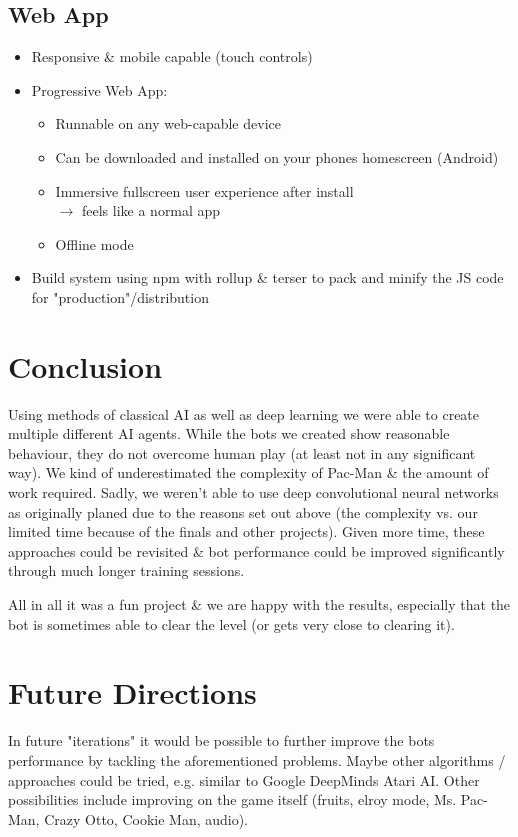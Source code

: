 \documentclass[10pt, letterpaper]{article}
\begin{document}
        \subsection{Web App}
            \begin{itemize}
                \item Responsive \& mobile capable (touch controls)
                \item Progressive Web App:
                    \begin{itemize}
                        \item Runnable on any web-capable device
                        \item Can be downloaded and installed on your phones homescreen (Android)
                        \item Immersive fullscreen user experience after install \\
                              $\rightarrow$ feels like a normal app
                        \item Offline mode
                    \end{itemize}
                \item Build system using npm with rollup \& terser to pack and minify the JS code for "production"/distribution
            \end{itemize}
            
    \section{Conclusion}
        Using methods of classical AI as well as deep learning we were able to create multiple different AI agents. While the bots we created show reasonable behaviour, they do not overcome human play (at least not in any significant way). We kind of underestimated the complexity of Pac-Man \& the amount of work required. Sadly, we weren't able to use deep convolutional neural networks as originally planed due to the reasons set out above (the complexity vs. our limited time because of the finals and other projects). Given more time, these approaches could be revisited \& bot performance could be improved significantly through much longer training sessions.
        
        All in all it was a fun project \& we are happy with the results, especially that the bot is sometimes able to clear the level (or gets very close to clearing it).
    
    \section{Future Directions}
        In future "iterations" it would be possible to further improve the bots performance by tackling the aforementioned problems. Maybe other algorithms / approaches could be tried, e.g. similar to Google DeepMinds Atari AI. Other possibilities include improving on the game itself (fruits, elroy mode, Ms. Pac-Man, Crazy Otto, Cookie Man, audio). 
        
\end{document}
